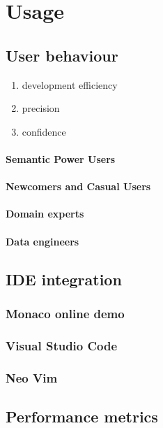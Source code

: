 \section{Usage}%
\label{sec:usage}

\subsection{User behaviour}

\begin{enumerate}
\item development efficiency
\item precision
\item confidence
\end{enumerate}

\paragraph{Semantic Power Users}
\paragraph{Newcomers and Casual Users}
\paragraph{Domain experts}
\paragraph{Data engineers}

\subsection{IDE integration}

\subsubsection{Monaco online demo}
\subsubsection{Visual Studio Code}
\subsubsection{Neo Vim}

\subsection{Performance metrics}



